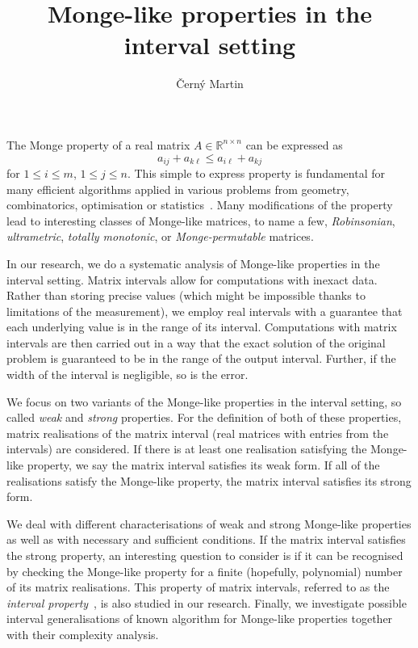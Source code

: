 \documentclass[a4paper]{amsart}
\date{}
\begin{document}
\title{Monge-like properties in the interval setting}
\author{\v{C}ern\'{y} Martin} %
\address{Charles University} %

\maketitle


The Monge property of a real matrix $A \in \mathbb{R}^{n \times n}$ can be expressed as
\[
a_{ij} + a_{k\ell} \leq a_{i\ell} + a_{kj} 
\]
for $1 \leq i \leq m$, $1 \leq j \leq n$. This simple to express property is fundamental for many efficient algorithms applied in various problems from geometry, combinatorics, optimisation or statistics~\cite{survey,survey2}. Many modifications of the property lead to interesting classes of Monge-like matrices, to name a few, \textit{Robinsonian}, \textit{ultrametric}, \textit{totally monotonic}, or \textit{Monge-permutable} matrices.

In our research, we do a systematic analysis of Monge-like properties in the interval setting. Matrix intervals allow for computations with inexact data. Rather than storing precise values (which might be impossible thanks to limitations of the measurement), we employ real intervals with a guarantee that each underlying value is in the range of its interval. Computations with matrix intervals are then carried out in a way that the exact solution of the original problem is guaranteed to be in the range of the output interval. Further, if the width of the interval is negligible, so is the error. 

We focus on two variants of the Monge-like properties in the interval setting, so called \textit{weak} and \textit{strong} properties. For the definition of both of these properties, matrix realisations of the matrix interval (real matrices with entries from the intervals) are considered. If there is at least one realisation satisfying the Monge-like property, we say the matrix interval satisfies its weak form. If all of the realisations satisfy the Monge-like property, the matrix interval satisfies its strong form.

We deal with different characterisations of weak and strong Monge-like properties as well as with necessary and sufficient conditions. If the matrix interval satisfies the strong property, an interesting question to consider is if it can be recognised by checking the Monge-like property for a finite (hopefully, polynomial) number of its matrix realisations. This property of matrix intervals, referred to as the \textit{interval property}~\cite{Garloff}, is also studied in our research. Finally, we investigate possible interval generalisations of known algorithm for Monge-like properties together with their complexity analysis.
\end{document}
